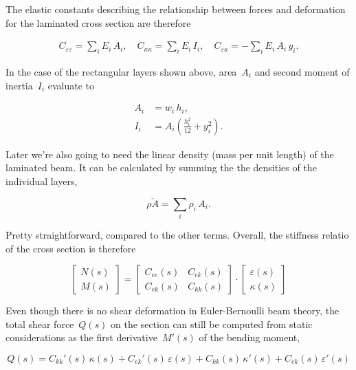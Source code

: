 The elastic constants describing the relationship between forces and deformation for the laminated cross section are therefore

\begin{align}
C_{\varepsilon\varepsilon} = \sum_i E_i\,A_i,\quad
C_{\kappa\kappa} = \sum_i E_i\,I_{i},\quad
C_{\varepsilon\kappa} = -\sum_i E_i\,A_i\,y_i.
\end{align}

In the case of the rectangular layers shown above, area~$A_i$ and second moment of inertia~$I_i$ evaluate to

\begin{align}
A_i &= w_i\,h_i,\\
I_i &= A_i\left(\frac{h_i^2}{12} + y_i^2\right).
\end{align}

Later we're also going to need the linear density (mass per unit length) of the laminated beam. It can be calculated by summing the the densities of the individual layers,

\begin{equation}
\overline{\rho A} = \sum_i \rho_i\,A_i.\label{eq:beam-linear-density}
\end{equation}

Pretty straightforward, compared to the other terms.
Overall, the stiffness relatio of the cross section is therefore

\begin{equation}
\begin{bmatrix}
N(s) \\ M(s)
\end{bmatrix}
=
\begin{bmatrix}
C_{ee}(s) & C_{ek}(s) \\
C_{ek}(s) & C_{kk}(s)
\end{bmatrix}
\cdot
\begin{bmatrix}
\varepsilon(s) \\ \kappa(s)
\end{bmatrix}
\end{equation}

Even though there is no shear deformation in Euler-Bernoulli beam theory, the total shear force~$Q(s)$ on the section can still be computed from static considerations as the first derivative~$M'(s)$ of the bending moment,

\begin{equation}
Q(s) = C_{kk}'(s)\,\kappa(s) + C_{ek}'(s)\,\varepsilon(s) + C_{kk}(s)\,\kappa'(s) + C_{ek}(s)\,\varepsilon'(s)
\end{equation}

